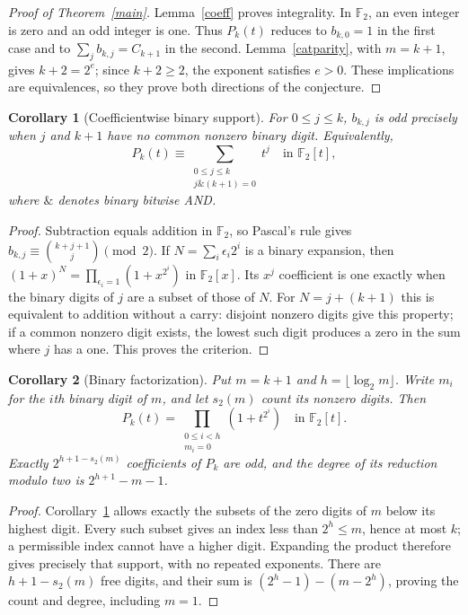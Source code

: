 \documentclass[11pt]{article}
\newtheorem{corollary}{Corollary}
\newcommand{\FF}{\mathbb F_2}
\begin{document}
\begin{proof}[Proof of Theorem~\ref{main}]
Lemma~\ref{coeff} proves integrality. In $\FF$, an even integer is zero
and an odd integer is one. Thus $P_k(t)$ reduces to $b_{k,0}=1$ in the
first case and to $\sum_j b_{k,j}=C_{k+1}$ in the second.
Lemma~\ref{catparity}, with $m=k+1$, gives $k+2=2^e$; since $k+2\ge2$,
the exponent satisfies $e>0$. These implications are equivalences,
so they prove both directions of the conjecture.
\end{proof}

\begin{corollary}[Coefficientwise binary support]\label{binary}
For $0\le j\le k$, $b_{k,j}$ is odd precisely when $j$ and $k+1$ have
no common nonzero binary digit. Equivalently,
\[
 P_k(t)\equiv\sum_{\substack{0\le j\le k\\j\mathbin{\&}(k+1)=0}}t^j
 \quad\text{in }\FF[t],
\]
where $\mathbin{\&}$ denotes binary bitwise AND.
\end{corollary}
\begin{proof}
Subtraction equals addition in $\FF$, so Pascal's rule gives
$b_{k,j}\equiv\binom{k+j+1}{j}\pmod2$.
If $N=\sum_i\epsilon_i2^i$ is a binary expansion, then
$(1+x)^N=\prod_{\epsilon_i=1}(1+x^{2^i})$ in $\FF[x]$.
Its $x^j$ coefficient is one exactly when the binary digits of $j$
are a subset of those of $N$. For $N=j+(k+1)$ this is equivalent to
addition without a carry: disjoint nonzero digits give this property;
if a common nonzero digit exists, the lowest such digit produces a zero
in the sum where $j$ has a one. This proves the criterion.
\end{proof}

\begin{corollary}[Binary factorization]\label{product}
Put $m=k+1$ and $h=\lfloor\log_2 m\rfloor$. Write $m_i$ for the $i$th
binary digit of $m$, and let $s_2(m)$ count its nonzero digits. Then
\[
 P_k(t)=\prod_{\substack{0\le i<h\\m_i=0}}(1+t^{2^i})
 \quad\text{in }\FF[t].
\]
Exactly $2^{h+1-s_2(m)}$ coefficients of $P_k$ are odd, and the degree
of its reduction modulo two is $2^{h+1}-m-1$.
\end{corollary}
\begin{proof}
Corollary~\ref{binary} allows exactly the subsets of the zero digits of
$m$ below its highest digit. Every such subset gives an index less than
$2^h\le m$, hence at most $k$; a permissible index cannot have a higher
digit. Expanding the product therefore gives precisely that support,
with no repeated exponents. There are $h+1-s_2(m)$ free digits, and their
sum is $(2^h-1)-(m-2^h)$, proving the count and degree, including $m=1$.
\end{proof}
\end{document}
